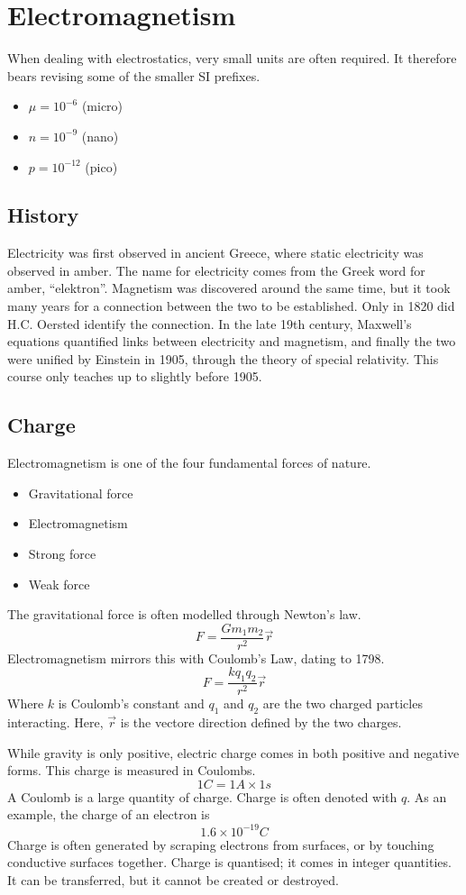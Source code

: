 \documentclass[12pt]{report}
\begin{document}
\section*{Electromagnetism}

When dealing with electrostatics, very small units are often required.
It therefore bears revising some of the smaller SI prefixes.
\begin{itemize}
    \item \(\mu = 10^{-6}\) (micro)
    \item \(n = 10^{-9}\) (nano)
    \item \(p = 10^{-12}\) (pico)
\end{itemize}

\subsection*{History}
Electricity was first observed in ancient Greece, where static electricity was
observed in amber. The name for electricity comes from the Greek word for 
amber, ``elektron''. Magnetism was discovered around the same time, but it took
many years for a connection between the two to be established. Only in 1820 did
H.C. Oersted identify the connection. In the late 19th century, Maxwell's 
equations quantified links between electricity and magnetism, and finally the
two were unified by Einstein in 1905, through the theory of special relativity.
This course only teaches up to slightly before 1905.

\subsection*{Charge}
Electromagnetism is one of the four fundamental forces of nature.
\begin{itemize}
    \item Gravitational force
    \item Electromagnetism
    \item Strong force
    \item Weak force
\end{itemize}
The gravitational force is often modelled through Newton's law.
\[F = \frac{Gm_1m_2}{r^2}\vec{r}\]
Electromagnetism mirrors this with Coulomb's Law, dating to 1798.
\[F = \frac{kq_1q_2}{r^2}\vec{r}\]
Where \(k\) is Coulomb's constant and \(q_1\) and \(q_2\) are the two charged
particles interacting. Here, \(\vec{r}\) is the vectore direction defined by
the two charges. \par
While gravity is only positive, electric charge comes in both positive and
negative forms. This charge is measured in Coulombs.
\[1C = 1A \times 1s\]
A Coulomb is a large quantity of charge. Charge is often denoted with \(q\).
As an example, the charge of an electron is
\[1.6 \times 10^{-19}C\]
Charge is often generated by scraping electrons from surfaces, or by touching
conductive surfaces together. 
Charge is quantised; it comes in integer quantities. It can be transferred, but
it cannot be created or destroyed.
\end{document}
